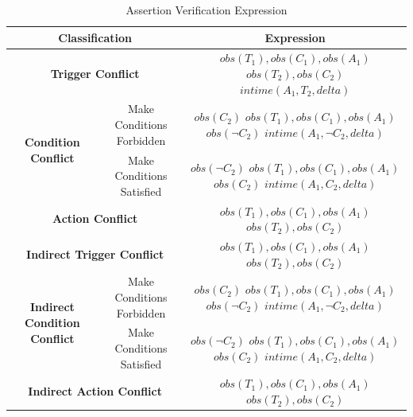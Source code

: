 \begin{table}[t]
		\caption{Assertion Verification Expression}
		\label{Assertion_Verification}
		\begin{adjustbox}{width=0.4\textwidth}
		\begin{tabular}[width=1\textwidth]{c|c|c}
			\hline
			\multicolumn{2}{c|}{\textbf{Classification}} & \textbf{Expression}\\
			\hline
			
			\multicolumn{2}{c|}{\textbf{Trigger Conflict}} &
			\makecell{
				$obs(T_1), obs(C_1), obs(A_1)$ \\
				$obs(T_2), obs(C_2)$ \\
				$intime(A_1, T_2, delta)$}\\
			\hline
			
			\multirow{2}{*}{\textbf{Condition Conflict}} & Make Conditions Forbidden &
			\makecell{$obs(C_2)$ \\
			$obs(T_1), obs(C_1), obs(A_1)$ \\
			$obs(\neg C_2)$ \\
			$intime(A_1, \neg C_2, delta)$} \\
			\cline{2-3}
			& Make Conditions Satisfied &
			\makecell{$obs(\neg C_2)$ \\
			$obs(T_1), obs(C_1), obs(A_1)$ \\
			$obs(C_2)$\\
			$intime(A_1, C_2, delta)$ }\\
			\hline
			
			\multicolumn{2}{c|}{\textbf{Action Conflict}} &
			\makecell{
				$obs(T_1), obs(C_1), obs(A_1)$ 
				\\ $obs(T_2), obs(C_2)$}\\
			\hline
			
			\multicolumn{2}{c|}{\textbf{Indirect Trigger Conflict}} &
			\makecell{$obs(T_1), obs(C_1), obs(A_1)$ \\
			$obs(T_2), obs(C_2)$} \\
			\hline
			
			\multirow{2}{*}{\textbf{Indirect Condition Conflict}} & Make Conditions Forbidden &
			\makecell{$obs(C_2)$ \\
			$obs(T_1), obs(C_1), obs(A_1)$ \\
			$obs(\neg C_2)$  \\
			$intime(A_1, \neg C_2, delta)$ }\\
			\cline{2-3}
			& Make Conditions Satisfied &
			\makecell{$obs(\neg C_2)$ \\
			$obs(T_1), obs(C_1), obs(A_1)$ \\
			$obs(C_2)$ \\
			$intime(A_1,  C_2, delta)$ }\\
			\hline
			
			\multicolumn{2}{c|}{\textbf{Indirect Action Conflict}}&
			\makecell{$obs(T_1), obs(C_1), obs(A_1)$ \\
				$obs(T_2), obs(C_2)$} \\
			\hline
			
		\end{tabular}
		\end{adjustbox}
\end{table}

